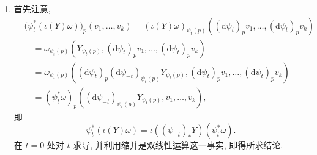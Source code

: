 \begin{description}[font=\normalfont,leftmargin=2em,labelwidth=1.5em]
\begin{enumerate}[label=(\alph*),ref=\alph*,leftmargin=*]
\begin{align*}
  &\iota(X)\mathrm{d}(\omega\wedge\eta)+\mathrm{d}(\iota(X)(\omega\wedge\eta))\\
  &\quad=\iota(X)(\mathrm{d}\omega\wedge\eta+(-1)^k\omega\wedge\mathrm{d}\eta)
     +\mathrm{d}((\iota(X)\omega)\wedge\eta+(-1)^k\omega\wedge(\iota(X)\eta))\\
  &\quad=(\iota(X)\mathrm{d}\omega)\wedge\eta
     +(-1)^{k+1}\mathrm{d}\omega\wedge(\iota(X)\eta)
     +(-1)^k(\iota(X)\omega)\wedge\mathrm{d}\eta\\
  &\qquad+\omega\wedge(\iota(X)\mathrm{d}\eta)
     +\mathrm{d}(\iota(X)\omega)\wedge\eta
     +(-1)^{k-1}(\iota(X)\omega)\wedge\mathrm{d}\eta\\
  &\qquad+(-1)^k\mathrm{d}\omega\wedge(\iota(X)\eta)+\omega\wedge\mathrm{d}(\iota(X)\eta)\\
  &\quad=(\iota(X)\mathrm{d}\omega)\wedge\eta+\omega\wedge(\iota(X)\mathrm{d}\eta)
        +\mathrm{d}(\iota(X)\omega)\wedge\eta+\omega\wedge\mathrm{d}(\iota(X)\eta)\\
  &\quad=(L_X\omega)\wedge\eta+\omega\wedge(L_X\eta)=L_X(\omega\wedge\eta)
\end{align*}
(这里使用了 Exercise~\ref{ex:tensors}(\ref{ex:contraction-of-alternating-tensors})).
\item 首先注意,
\begin{align*}
  &\bigl(\psi_t^*(\iota(Y)\omega)\bigr)_p(v_1,\ldots,v_k)
   =(\iota(Y)\omega)_{\psi_t(p)}((\mathrm{d}\psi_t)_pv_1,\ldots,(\mathrm{d}\psi_t)_pv_k)\\
  &\quad=\omega_{\psi_t(p)}(Y_{\psi_t(p)},(\mathrm{d}\psi_t)_pv_1,\ldots,(\mathrm{d}\psi_t)_pv_k)\\
  &\quad=\omega_{\psi_t(p)}((\mathrm{d}\psi_t)_p(\mathrm{d}\psi_{-t})_{\psi_t(p)}Y_{\psi_t(p)},
                            (\mathrm{d}\psi_t)_pv_1,\ldots,(\mathrm{d}\psi_t)_pv_k)\\
  &\quad=(\psi_t^*\omega)_p((\mathrm{d}\psi_{-t})_{\psi_t(p)}Y_{\psi_t(p)},v_1,\ldots,v_k),
\end{align*}
即
\[
  \psi_t^*(\iota(Y)\omega)=\iota((\psi_{-t})_*Y)(\psi_t^*\omega).
\]
在 $t=0$ 处对 $t$ 求导, 并利用缩并是双线性运算这一事实, 即得所求结论.
\end{enumerate}
\end{description}
